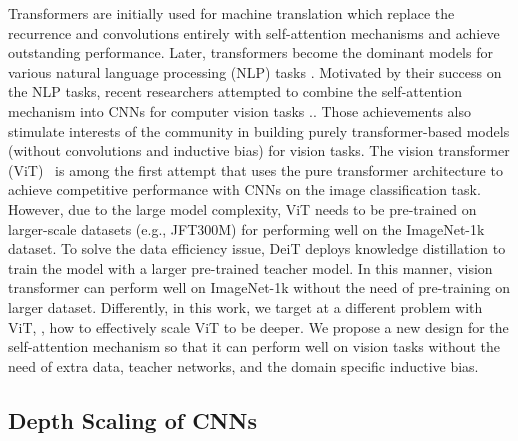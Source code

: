 \documentclass[10pt,twocolumn,letterpaper]{article}
\begin{document}
Transformers \cite{vaswani2017attention} are initially used for machine translation which replace the recurrence and convolutions entirely with self-attention mechanisms \cite{ramachandran2019stand,hu2019local,zhao2020exploring,ho2019axial,wang2020axial,jiang2020convbert} and achieve outstanding performance. Later,  transformers become the dominant models   for  various  natural language processing (NLP) tasks \cite{brown2020language,radford2019language,devlin2018bert,liu2019roberta}. Motivated by  their success  on the NLP tasks, recent  researchers attempted to combine the self-attention mechanism into CNNs   for computer vision tasks \cite{wang2018non,carion2020end,chen2020pre,sun2019videobert,lu2019vilbert,zheng2020rethinking,zhao2020point}.. Those achievements also stimulate interests of the community in building purely transformer-based models (without convolutions and inductive bias) for vision tasks.  
The vision transformer (ViT)~\cite{dosovitskiy2020image} is among the first attempt that uses the pure transformer architecture to achieve competitive performance with CNNs on the image classification task. However, due to the large model complexity, ViT needs to be pre-trained on larger-scale  datasets (e.g., JFT300M) for  performing  well on the ImageNet-1k dataset. To solve the data efficiency issue, DeiT \cite{touvron2020training}   deploys knowledge distillation to   train the model with a larger pre-trained teacher model. In this manner, vision transformer can perform well on ImageNet-1k without the need of pre-training on larger dataset. Differently, in this work, we target at a different problem with ViT, \ie, how to effectively scale ViT to be deeper. We propose  a new design for the self-attention mechanism so that it can perform well on vision tasks without the need of extra data, teacher networks,
and the domain specific inductive bias.


\subsection{Depth Scaling  of CNNs   }
\end{document}
